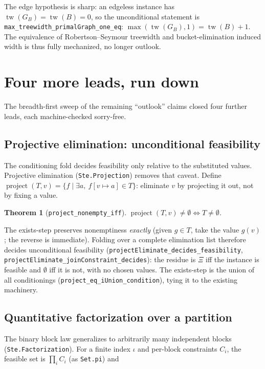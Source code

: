 \documentclass[11pt]{article}
\newtheorem{theorem}{Theorem}
\newcommand{\lean}[1]{\texttt{#1}}
\newcommand{\Xii}{\Xi}
\begin{document}
\noindent The edge hypothesis is sharp: an edgeless instance has
$\operatorname{tw}(G_B) = \operatorname{tw}(B) = 0$, so the unconditional
statement is \lean{max\_treewidth\_primalGraph\_one\_eq}:
$\max(\operatorname{tw}(G_B), 1) = \operatorname{tw}(B) + 1$.  The
equivalence of Robertson--Seymour treewidth and bucket-elimination
induced width is thus fully mechanized, no longer outlook.

\section{Four more leads, run down}

The breadth-first sweep of the remaining ``outlook'' claims closed four
further leads, each machine-checked sorry-free.

\subsection{Projective elimination: unconditional feasibility}
\label{sec:projection}
The conditioning fold decides
feasibility only relative to the substituted values.  Projective
elimination (\lean{Ste.Projection}) removes that caveat.  Define
$\operatorname{project}(T, v) = \{f \mid \exists a,\ f[v \mapsto a] \in
T\}$: eliminate $v$ by projecting it out, not by fixing a value.

\begin{theorem}[\lean{project\_nonempty\_iff}]
$\operatorname{project}(T, v) \ne \emptyset \iff T \ne \emptyset$.
\end{theorem}

\noindent The exists-step preserves nonemptiness \emph{exactly} (given
$g \in T$, take the value $g(v)$; the reverse is immediate).  Folding
over a complete elimination list therefore decides unconditional
feasibility (\lean{projectEliminate\_decides\_feasibility},
\lean{projectEliminate\_joinConstraint\_decides}): the residue is
$\Xii$ iff the instance is feasible and $\emptyset$ iff it is not, with
no chosen values.  The exists-step is the union of all conditionings
(\lean{project\_eq\_iUnion\_condition}), tying it to the existing
machinery.

\subsection{Quantitative factorization over a partition}
The binary block law generalizes to arbitrarily
many independent blocks (\lean{Ste.Factorization}).  For a finite index
$\iota$ and per-block constraints $C_i$, the feasible set is
$\prod_i C_i$ (as \lean{Set.pi}) and
\end{document}
